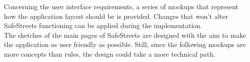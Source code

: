 Concerning the user interface requirements, a series of mockups that represent how the application layout should be is provided. Changes that won't alter SafeStreets functioning can be applied during the implementation.\\
The sketches of the main pages of SafeStreets are designed with the aim to make the application as user friendly as possible. Still, since the following mockups are more concepts than rules, the design could take a more technical path. \\
